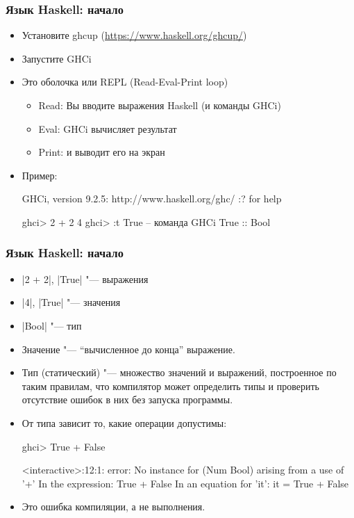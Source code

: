 \documentclass[10pt]{beamer}
\begin{document}
\begin{frame}[fragile]
  \frametitle{Язык Haskell: начало}
  \begin{itemize}
    \item Установите ghcup (\url{https://www.haskell.org/ghcup/})
    \item Запустите GHCi
    \item Это оболочка или REPL (Read-Eval-Print loop)
          \begin{itemize}
            \item Read: Вы вводите выражения Haskell (и команды GHCi)
            \item Eval: GHCi вычисляет результат
            \item Print: и выводит его на экран
          \end{itemize}
    \item Пример:
          \begin{ghci}
            GHCi, version 9.2.5: http://www.haskell.org/ghc/  :? for help
          \end{ghci}
          \begin{haskell}
            ghci> 2 + 2
            4
            ghci> :t True -- команда GHCi
            True :: Bool
          \end{haskell}
  \end{itemize}
\end{frame}

\begin{frame}[fragile]
  \frametitle{Язык Haskell: начало}
  \begin{itemize}
    \item \haskinline|2 + 2|, \haskinline|True| "--- выражения
    \item \haskinline|4|, \haskinline|True| "--- значения
    \item \haskinline|Bool| "--- тип
          \pause
    \item Значение "--- \enquote{вычисленное до конца} выражение.
    \item Тип (статический) "--- множество значений и выражений, построенное по таким правилам, что компилятор может определить типы и проверить отсутствие ошибок в них без запуска программы.
    \item От типа зависит то, какие операции допустимы:
          \begin{haskell}
            ghci> True + False
          \end{haskell}
          \begin{ghci}
            <interactive>:12:1: error:
            No instance for (Num Bool) arising from a use of '+'
            In the expression: True + False
            In an equation for 'it': it = True + False
          \end{ghci}
    \item Это ошибка компиляции, а не выполнения.
  \end{itemize}
\end{frame}
\end{document}
